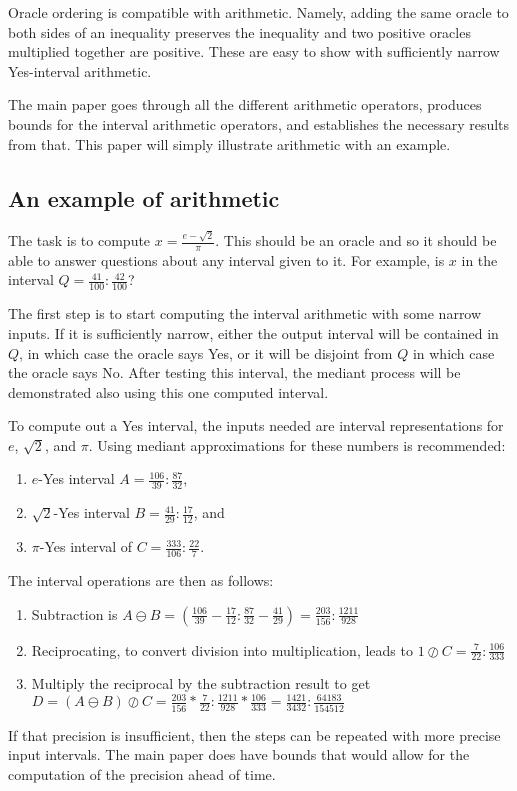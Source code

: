 \documentclass[12pt]{article}
\begin{document}
Oracle ordering is compatible with arithmetic. Namely, adding the same oracle to both sides of an inequality preserves the inequality and two positive oracles multiplied together are positive. These are easy to show with sufficiently narrow Yes-interval arithmetic. 

The main paper goes through all the different arithmetic operators, produces bounds for the interval arithmetic operators, and establishes the necessary results from that. This paper will simply illustrate arithmetic with an example. 

\subsection{An example of arithmetic}

The task is to compute $x = \frac{e-\sqrt{2}}{\pi}$. This should be an oracle and so it should be able to answer questions about any interval given to it. For example, is $x$ in the interval $Q = \frac{41}{100}: \frac{42}{100}$? 

The first step is to start computing the interval arithmetic with some narrow inputs. If it is sufficiently narrow, either the output interval will be contained in $Q$, in which case the oracle says Yes, or it will be disjoint from $Q$ in which case the oracle says No. After testing this interval, the mediant process will be demonstrated also using this one computed interval. 

To compute out a Yes interval, the inputs needed are interval representations for $e$, $\sqrt{2}$, and $\pi$. Using mediant approximations for these numbers is recommended: 
\begin{enumerate}
\item $e$-Yes interval $A  = \frac{106}{39}: \frac{87}{32}$,
\item $\sqrt{2}$-Yes interval $B = \frac{41}{29}: \frac{17}{12}$, and
\item $\pi$-Yes interval of $C= \frac{333}{106}: \frac{22}{7}$.
\end{enumerate}
The interval operations are then as follows:
\begin{enumerate}
\item Subtraction is $A\ominus B = (\frac{106}{39} - \frac{17}{12}: \frac{87}{32} - \frac{41}{29}) = \frac{203}{156}: \frac{1211}{928}$ 
\item Reciprocating, to convert division into multiplication, leads to  $1\oslash C = \frac{7}{22}: \frac{106}{333}$
\item Multiply the reciprocal by the subtraction result to get $D = (A\ominus B)\oslash C = \frac{203}{156} *\frac{7}{22}: \frac{1211}{928} * \frac{106}{333} = \frac{1421}{3432}: \frac{64183}{154512}$
\end{enumerate}
If that precision is insufficient, then the steps can be repeated with more precise input intervals. The main paper does have bounds that would allow for the computation of the precision ahead of time. 
\end{document}
